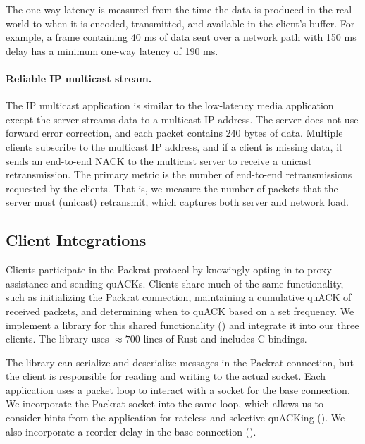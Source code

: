 The one-way latency is measured from the time the data is produced in the real
world to when it is encoded, transmitted, and available in the client's
buffer. For example, a frame containing 40 ms of data sent over a network path
with 150 ms delay has a minimum one-way latency of 190 ms.

\paragraph{Reliable IP multicast stream.}

The IP multicast application is similar to the low-latency media application
except the server streams data to a multicast IP address. The server does not
use forward error correction, and each packet contains 240 bytes of data. Multiple clients
subscribe to the multicast IP address, and if a client is missing data,
it sends an end-to-end NACK to the
multicast server to receive a unicast retransmission.
The primary metric is the number of end-to-end retransmissions requested by
the clients. That is, we measure the number of packets that the server
must (unicast) retransmit, which captures both server and network load.

\subsection{Client Integrations}
\label{sec:packrat:implementation:client-integrations}



Clients participate in the Packrat protocol by knowingly opting in to proxy
assistance and sending quACKs. Clients share much of the same functionality,
such as initializing the Packrat connection, maintaining a cumulative quACK of
received packets, and determining when to quACK based on a set frequency. We
implement a library for this shared functionality ()
and integrate it into our three clients.
The library uses $\approx\!700$ lines of Rust and includes C bindings.

The library can serialize and deserialize messages in the Packrat connection, but
the client is responsible for reading and writing to the actual socket. Each
application uses a packet loop to interact with a socket for the base
connection. We incorporate the Packrat socket into the same loop, which allows us to
consider hints from the application for rateless and selective quACKing
(). We also
incorporate a reorder delay in the base connection ().


